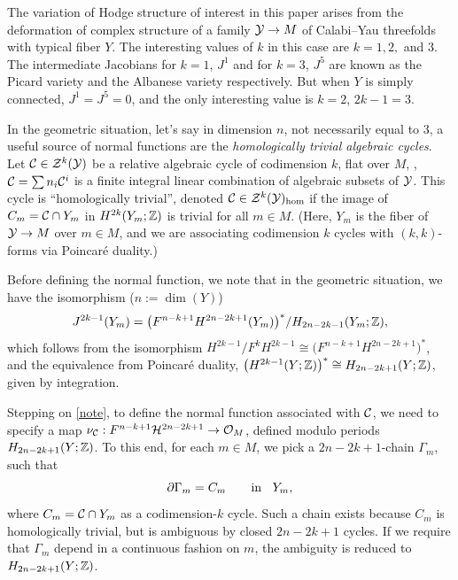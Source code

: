 The variation of Hodge structure of interest in this paper arises from the
deformation of complex structure of a family ${\cal Y}\to M$ 
of Calabi--Yau threefolds with typical fiber $Y$.
The interesting values of $k$ in this case are $k=1,2,$
and $3$. The intermediate Jacobians for $k=1$, $J^1$ and for $k=3$,
$J^5$ are known as the Picard variety and the Albanese variety respectively.
But when $Y$ is simply connected, $J^1=J^5=0$, and the only interesting
value is $k=2$, $2k-1=3$.

In the geometric situation, let's say in dimension $n$, not necessarily
equal to $3$, a useful source of normal functions are the {\it homologically 
trivial algebraic cycles}. Let ${\cal C}\in {\cal Z}^k({\cal Y})$ be 
a relative algebraic cycle of codimension $k$, flat over $M$, \ie, 
${\cal C}=\sum n_i{\cal C}^i$ is a finite integral linear combination 
of algebraic subsets of ${\cal Y}$. This cycle is ``homologically trivial'',
denoted ${\cal C}\in{\cal Z}^k({\cal Y})_{\rm hom}$ if the image of $C_m={\cal C}\cap
 Y_m$ in $H^{2k}(Y_m;{\mathbb Z})$ is trivial for all $m\in M$. (Here, $Y_m$ is 
the fiber of ${\cal Y}\to M$ over $m\in M$, and we are associating codimension 
$k$ cycles with $(k,k)$-forms via Poincar\'e duality.) 

Before defining the normal function, we note that in the geometric 
situation, we have the isomorphism ($n:=\dim(Y)$)
\begin{equation}
\eqlabel{note}
J^{2k-1}(Y_m) = \bigl(F^{n-k+1} H^{2n-2k+1}(Y_m)\bigr)^*/H_{2n-2k-1}(Y_m;\zet) ,
\end{equation}
which follows from the isomorphism $H^{2k-1}/F^k H^{2k-1} \cong 
\bigl(F^{n-k+1}H^{2n-2k+1}\bigr)^*$, and the equivalence from Poincar\'e
duality, $\bigl( H^{2k-1}(Y;{\mathbb Z})\bigr)^* \cong H_{2n-2k+1}(Y;{\mathbb Z})$,
given by integration. 

Stepping on \eqref{note}, to define the normal function associated with
${\cal C}$, we need to specify a map $\nu_{\cal C}: F^{n-k+1}
{\cal H}^{2n-2k+1}\to {\cal O}_M$, defined modulo periods $H_{2n-2k+1}(Y;{\mathbb Z})$. 
To this end, for each $m\in M$, we pick a $2n-2k+1$-chain $\Gamma_m$, such 
that
\begin{equation}
\eqlabel{chainchoice}
\del\Gamma_m = C_m \qquad \text{in\;\; $Y_m$} ,
\end{equation}
where $C_m={\cal C}\cap Y_m$ as a codimension-$k$ cycle. Such a chain
exists because $C_m$ is homologically trivial, but is ambiguous by closed
$2n-2k+1$ cycles. If we require that $\Gamma_m$ depend in a continuous
fashion on $m$, the ambiguity is reduced to $H_{2n-2k+1}(Y;{\mathbb Z})$.

